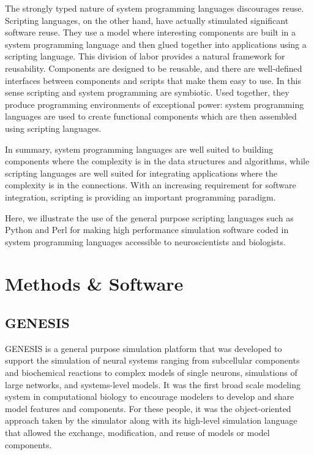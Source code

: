 \documentclass[12pt]{article}
\begin{document}
The strongly typed nature of system programming languages discourages
reuse. Scripting languages, on the other hand, have actually
stimulated significant software reuse. They use a model where
interesting components are built in a system programming language and
then glued together into applications using a scripting language.
This division of labor provides a natural framework for reusability.
Components are designed to be reusable, and there are well-defined
interfaces between components and scripts that make them easy to use.
In this sense scripting and system programming are symbiotic. Used
together, they produce programming environments of exceptional power:
system programming languages are used to create functional components
which are then assembled using scripting languages.

In summary, system programming languages are well suited to building
components where the complexity is in the data structures and
algorithms, while scripting languages are well suited for integrating
applications where the complexity is in the connections. With an
increasing requirement for software integration, scripting is
providing an important programming paradigm.

Here, we illustrate the use of the general purpose scripting languages such as Python and Perl
for making high performance simulation software coded in system
programming languages accessible to neuroscientists and biologists.




\section{Methods \& Software}

\subsection{GENESIS}

GENESIS is a general purpose simulation
platform that was developed to support the simulation of neural
systems ranging from subcellular components and biochemical reactions
to complex models of single neurons, simulations of large networks,
and systems-level models. It was the first broad scale modeling system
in computational biology to encourage modelers to develop and share
model features and components. For these people, it was the
object-oriented approach taken by the simulator along with its
high-level simulation language that allowed the exchange,
modification, and reuse of models or model
components. 
\end{document}
